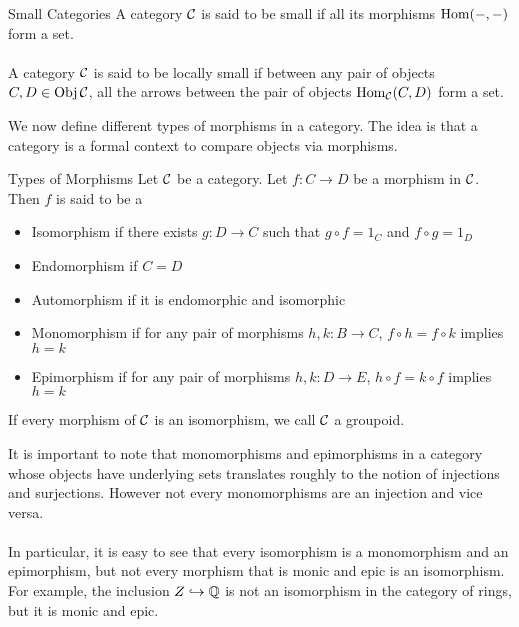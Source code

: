 \documentclass[a4paper]{article}
\begin{document}
\begin{defn}{Small Categories}{} A category $\mathcal{C}$ is said to be small if all its morphisms $\operatorname{Hom}(-,-)$ form a set. \\~\\
A category $\mathcal{C}$ is said to be locally small if between any pair of objects $C,D\in\operatorname{Obj}\mathcal{C}$, all the arrows between the pair of objects $\operatorname{Hom}_{\mathcal{C}}(C,D)$ form a set. 
\end{defn}

We now define different types of morphisms in a category. The idea is that a category is a formal context to compare objects via morphisms. 

\begin{defn}{Types of Morphisms}{} Let $\mathcal{C}$ be a category. Let $f:C\to D$ be a morphism in $\mathcal{C}$. Then $f$ is said to be a
\begin{itemize}
\item Isomorphism if there exists $g:D\to C$ such that $g\circ f=1_C$ and $f\circ g=1_D$
\item Endomorphism if $C=D$
\item Automorphism if it is endomorphic and isomorphic
\item Monomorphism if for any pair of morphisms $h,k:B\to C$, $f\circ h=f\circ k$ implies $h=k$
\item Epimorphism if for any pair of morphisms $h,k:D\to E$, $h\circ f=k\circ f$ implies $h=k$
\end{itemize}
If every morphism of $\mathcal{C}$ is an isomorphism, we call $\mathcal{C}$ a groupoid. 
\end{defn}

It is important to note that monomorphisms and epimorphisms in a category whose objects have underlying sets translates roughly to the notion of injections and surjections. However not every monomorphisms are an injection and vice versa. \\~\\

In particular, it is easy to see that every isomorphism is a monomorphism and an epimorphism, but not every morphism that is monic and epic is an isomorphism. For example, the inclusion $Z\hookrightarrow\mathbb{Q}$ is not an isomorphism in the category of rings, but it is monic and epic. 
\end{document}
